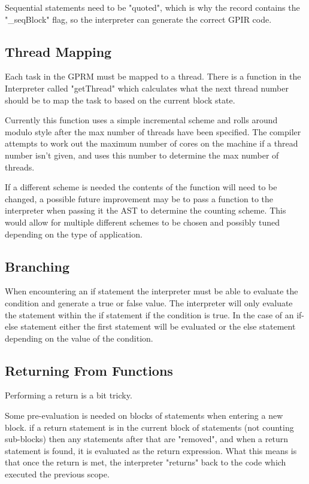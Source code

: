 Sequential statements need to be "quoted", which is why the record contains
the "\_seqBlock" flag, so the interpreter can generate the correct GPIR code.

\subsection{Thread Mapping}
Each task in the GPRM must be mapped to a thread. There is a function
in the Interpreter called "getThread" which calculates what the next thread 
number should be to map the task to based on the current block state.

Currently this function uses a simple incremental scheme and rolls around
modulo style after the max number of threads have been specified. The compiler
attempts to work out the maximum number of cores on the machine if a thread
number isn't given, and uses this number to determine the max number of threads.

If a different scheme is needed the contents of the function will need to be changed,
a possible future improvement may be to pass a function to the interpreter when passing
it the AST to determine the counting scheme. This would allow for multiple different schemes
to be chosen and possibly tuned depending on the type of application.


\subsection{Branching}
When encountering an if statement the interpreter must be able to evaluate the condition and generate a
true or false value. The interpreter will only evaluate the statement within the if statement
if the condition is true. In the case of an if-else statement either the first statement will
be evaluated or the else statement depending on the value of the condition.


\subsection{Returning From Functions}
Performing a return is a bit tricky. 

Some pre-evaluation is needed  on blocks of statements when entering a 
new block. if a return statement is
in the current block of statements (not counting sub-blocks) then
any statements after that are "removed", and when a return statement
is found, it is evaluated as the return expression.
What this means is that once the return is met, the interpreter
"returns" back to the code which executed the previous scope.

